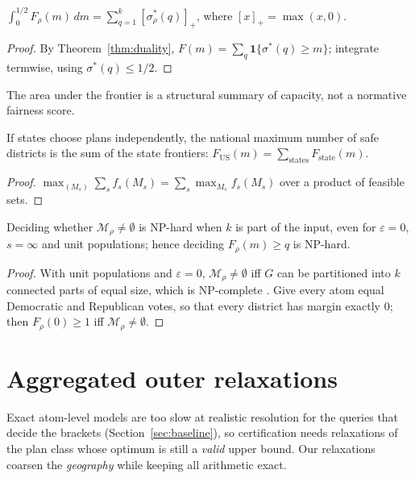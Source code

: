 \begin{corollary}\label{cor:layer}
$\displaystyle\int_0^{1/2}F_\rho(m)\,dm=\sum_{q=1}^k[\sigma^*_\rho(q)]_+$, where $[x]_+=\max(x,0)$.
\end{corollary}
\begin{proof}
By Theorem~\ref{thm:duality}, $F(m)=\sum_q\mathbf 1\{\sigma^*(q)\ge m\}$; integrate termwise, using $\sigma^*(q)\le 1/2$.
\end{proof}
The area under the frontier is a structural summary of capacity, not a normative fairness score.

\begin{proposition}[Separability]\label{prop:sep}
If states choose plans independently, the national maximum number of safe districts is the sum of the state frontiers: $F_{\mathrm{US}}(m)=\sum_{\text{states}}F_{\mathrm{state}}(m)$.
\end{proposition}
\begin{proof}
$\max_{(M_s)}\sum_s f_s(M_s)=\sum_s\max_{M_s}f_s(M_s)$ over a product of feasible sets.
\end{proof}

\begin{proposition}[Hardness]\label{prop:hard}
Deciding whether $\mathcal M_\rho\ne\emptyset$ is NP-hard when $k$ is part of the input, even for $\varepsilon=0$, $s=\infty$ and unit populations; hence deciding $F_\rho(m)\ge q$ is NP-hard.
\end{proposition}
\begin{proof}
With unit populations and $\varepsilon=0$, $\mathcal M_\rho\neq\emptyset$ iff $G$ can be partitioned into $k$ connected parts of equal size, which is NP-complete \citep{dyer1985}. Give every atom equal Democratic and Republican votes, so that every district has margin exactly $0$; then $F_\rho(0)\ge1$ iff $\mathcal M_\rho\ne\emptyset$.
\end{proof}

\section{Aggregated outer relaxations}\label{sec:relax}

Exact atom-level models are too slow at realistic resolution for the queries that decide the brackets (Section~\ref{sec:baseline}), so certification needs relaxations of the plan class whose optimum is still a \emph{valid} upper bound. Our relaxations coarsen the \emph{geography} while keeping all arithmetic exact.

